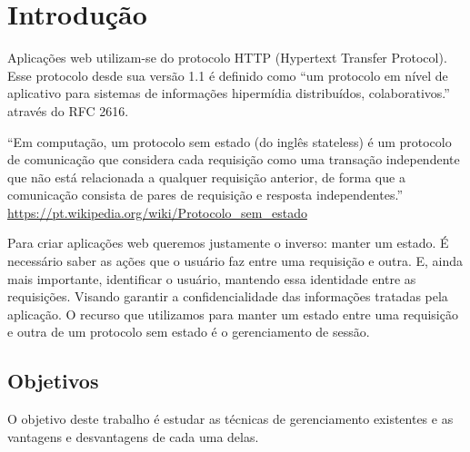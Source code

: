 
\chapter{Introdução}

Aplicações web utilizam-se do protocolo HTTP (Hypertext Transfer Protocol). Esse protocolo desde sua versão 1.1 é definido como ``um protocolo em nível de aplicativo para sistemas de informações hipermídia distribuídos, colaborativos.'' através do RFC 2616.

``Em computação, um protocolo sem estado (do inglês stateless) é um protocolo de comunicação que considera cada requisição como uma transação independente que não está relacionada a qualquer requisição anterior, de forma que a comunicação consista de pares de requisição e resposta independentes.'' \url{https://pt.wikipedia.org/wiki/Protocolo_sem_estado}

Para criar aplicações web queremos justamente o inverso: manter um estado. É necessário saber as ações que o usuário faz entre uma requisição e outra. E, ainda mais importante, identificar o usuário, mantendo essa identidade entre as requisições. Visando garantir a confidencialidade das informações tratadas pela aplicação. O recurso que utilizamos para manter um estado entre uma requisição e outra de um protocolo sem estado é o gerenciamento de sessão.






\section{Objetivos}

O objetivo deste trabalho é estudar as técnicas de gerenciamento existentes e as vantagens e desvantagens de cada uma delas.

